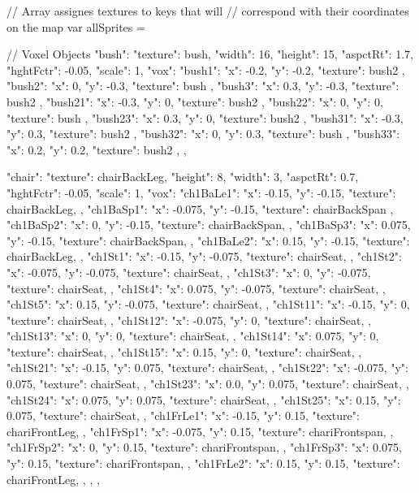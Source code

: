 // Array assignes textures to keys that will
// correspond with their coordinates on the map
var allSprites = {

  // Voxel Objects
  "bush": {
    "texture": bush,
    "width": 16,
    "height": 15,
    "aspctRt": 1.7,
    "hghtFctr": -0.05,
    "scale": 1,
    "vox": {
      "bush1":{ "x": -0.2, "y": -0.2, "texture": bush2 },
      "bush2":{ "x": 0, "y": -0.3, "texture": bush },
      "bush3":{ "x": 0.3, "y": -0.3, "texture": bush2 },
      "bush21":{ "x": -0.3, "y": 0, "texture": bush2 },
      "bush22":{ "x": 0, "y": 0, "texture": bush },
      "bush23":{ "x": 0.3, "y": 0, "texture": bush2 },
      "bush31":{ "x": -0.3, "y": 0.3, "texture": bush2 },
      "bush32":{ "x": 0, "y": 0.3, "texture": bush },
      "bush33":{ "x": 0.2, "y": 0.2, "texture": bush2 },
    }
  },  

  "chair": {
    "texture": chairBackLeg,
    "height": 8,
    "width": 3,
    "aspctRt": 0.7,
    "hghtFctr": -0.05,
    "scale": 1,
    "vox": {
      "ch1BaLe1":{ "x": -0.15, "y": -0.15, "texture": chairBackLeg, },
      "ch1BaSp1":{ "x": -0.075, "y": -0.15, "texture": chairBackSpan },
      "ch1BaSp2":{ "x": 0,    "y": -0.15, "texture": chairBackSpan, },
      "ch1BaSp3":{ "x": 0.075,  "y": -0.15, "texture": chairBackSpan, },
      "ch1BaLe2":{ "x": 0.15,  "y": -0.15, "texture": chairBackLeg, },
      "ch1St1":{ "x": -0.15,   "y": -0.075, "texture": chairSeat, },
      "ch1St2":{ "x": -0.075,   "y": -0.075, "texture": chairSeat, },
      "ch1St3":{ "x": 0,      "y": -0.075, "texture": chairSeat, },
      "ch1St4":{ "x": 0.075,    "y": -0.075, "texture": chairSeat, },
      "ch1St5":{ "x": 0.15,    "y": -0.075, "texture": chairSeat, },
      "ch1St11":{ "x": -0.15,  "y": 0, "texture": chairSeat, },
      "ch1St12":{ "x": -0.075,  "y": 0, "texture": chairSeat, },
      "ch1St13":{ "x": 0,     "y": 0, "texture": chairSeat, },
      "ch1St14":{ "x": 0.075,   "y": 0, "texture": chairSeat, },
      "ch1St15":{ "x": 0.15,   "y": 0, "texture": chairSeat, },
      "ch1St21":{ "x": -0.15,  "y": 0.075, "texture": chairSeat, },
      "ch1St22":{ "x": -0.075,  "y": 0.075, "texture": chairSeat, },
      "ch1St23":{ "x": 0.0,   "y": 0.075, "texture": chairSeat, },
      "ch1St24":{ "x": 0.075,   "y": 0.075, "texture": chairSeat, },
      "ch1St25":{ "x": 0.15,   "y": 0.075, "texture": chairSeat, },
      "ch1FrLe1":{ "x": -0.15, "y": 0.15, "texture": chariFrontLeg, },
      "ch1FrSp1":{ "x": -0.075, "y": 0.15, "texture": chariFrontspan, },
      "ch1FrSp2":{ "x": 0,    "y": 0.15, "texture": chariFrontspan, },
      "ch1FrSp3":{ "x": 0.075,  "y": 0.15, "texture": chariFrontspan, },
      "ch1FrLe2":{ "x": 0.15,  "y": 0.15, "texture": chariFrontLeg, },
    },
  },  

}
